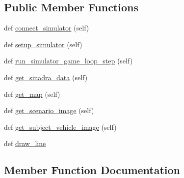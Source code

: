 \subsection*{Public Member Functions}
\begin{DoxyCompactItemize}
\item 
def \hyperlink{classimplementation_1_1simulators_1_1simulator__controller_1_1_simulator_controller_a7712a41b0eb99c1708c3d3b8fa857333}{connect\+\_\+simulator} (self)
\item 
def \hyperlink{classimplementation_1_1simulators_1_1simulator__controller_1_1_simulator_controller_a7c2a65ff6436876710a4ca3c9c976d27}{setup\+\_\+simulator} (self)
\item 
def \hyperlink{classimplementation_1_1simulators_1_1simulator__controller_1_1_simulator_controller_a8e44240be7fae6640ce790bf2e765564}{run\+\_\+simulator\+\_\+game\+\_\+loop\+\_\+step} (self)
\item 
def \hyperlink{classimplementation_1_1simulators_1_1simulator__controller_1_1_simulator_controller_a9f7953e17973cf3895b85dd132f56d5a}{get\+\_\+sinadra\+\_\+data} (self)
\item 
def \hyperlink{classimplementation_1_1simulators_1_1simulator__controller_1_1_simulator_controller_ad24f6ec1fe6ec1b13da2b3183f98dcb6}{get\+\_\+map} (self)
\item 
def \hyperlink{classimplementation_1_1simulators_1_1simulator__controller_1_1_simulator_controller_a60cbb121b4c001e8cf0073676170d45c}{get\+\_\+scenario\+\_\+image} (self)
\item 
def \hyperlink{classimplementation_1_1simulators_1_1simulator__controller_1_1_simulator_controller_a3f8215746649fb87dae9308e663ebd88}{get\+\_\+subject\+\_\+vehicle\+\_\+image} (self)
\item 
def \hyperlink{classimplementation_1_1simulators_1_1simulator__controller_1_1_simulator_controller_a2145a4a7f793f3a172c567b2b0d626c1}{draw\+\_\+line}
\end{DoxyCompactItemize}


\subsection{Member Function Documentation}
\mbox{\label{classimplementation_1_1simulators_1_1simulator__controller_1_1_simulator_controller_a7712a41b0eb99c1708c3d3b8fa857333}} 
